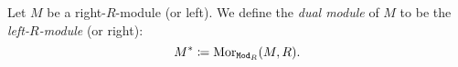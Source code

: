 \begin{definition}
    \label{def:dual-module}
    Let \(M\) be a right-\(R\)-module (or left). We define
    the \emph{dual module} of \(M\) to be the \emph{left-\(R\)-module}
    (or right):
    \[
        M^{*} \coloneq \operatorname{Mor}_{{\texttt{Mod}_{R}}}(M, R).
    \]
\end{definition}

